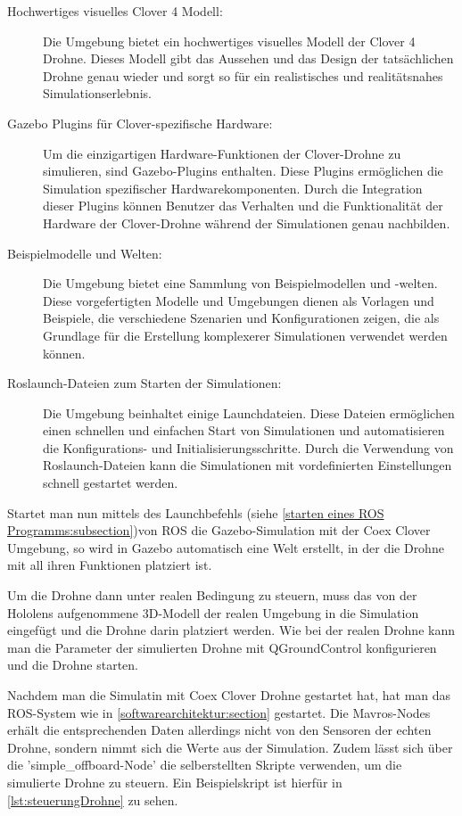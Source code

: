 \begin{description}
    \item[Hochwertiges visuelles Clover 4 Modell:] Die Umgebung bietet ein hochwertiges visuelles Modell der Clover 4 Drohne. Dieses Modell gibt das Aussehen und das Design der tatsächlichen Drohne genau wieder und sorgt so für ein realistisches und realitätsnahes Simulationserlebnis. 
    
    \item[Gazebo Plugins für Clover-spezifische Hardware:] Um die einzigartigen Hardware-Funktionen der Clover-Drohne zu simulieren, sind Gazebo-Plugins enthalten. Diese Plugins ermöglichen die Simulation spezifischer Hardwarekomponenten. Durch die Integration dieser Plugins können Benutzer das Verhalten und die Funktionalität der Hardware der Clover-Drohne während der Simulationen genau nachbilden.
    
    \item[Beispielmodelle und Welten:] Die Umgebung bietet eine Sammlung von Beispielmodellen und -welten. Diese vorgefertigten Modelle und Umgebungen dienen als Vorlagen und Beispiele, die verschiedene Szenarien und Konfigurationen zeigen, die als Grundlage für die Erstellung komplexerer Simulationen verwendet werden können.
    
    \item[Roslaunch-Dateien zum Starten der Simulationen:] Die Umgebung beinhaltet einige Launchdateien. Diese Dateien ermöglichen einen schnellen und einfachen Start von Simulationen und automatisieren die Konfigurations- und Initialisierungsschritte. Durch die Verwendung von Roslaunch-Dateien kann die Simulationen mit vordefinierten Einstellungen schnell gestartet werden.   
\end{description}

Startet man nun mittels des Launchbefehls (siehe \ref{starten eines ROS Programms:subsection})von \ac{ROS} die Gazebo-Simulation mit der Coex Clover Umgebung, so wird in Gazebo automatisch eine Welt erstellt, in der die Drohne mit all ihren Funktionen platziert ist.

Um die Drohne dann unter realen Bedingung zu steuern, muss das von der Hololens aufgenommene 3D-Modell der realen Umgebung in die Simulation eingefügt und die Drohne darin platziert werden. Wie bei der realen Drohne kann man die Parameter der simulierten Drohne mit QGroundControl konfigurieren und die Drohne starten.

Nachdem man die Simulatin mit Coex Clover Drohne gestartet hat, hat man das \ac{ROS}-System wie in \ref{softwarearchitektur:section} gestartet.
Die Mavros-Nodes erhält die entsprechenden Daten allerdings nicht von den Sensoren der echten Drohne, sondern nimmt sich die Werte aus der Simulation. Zudem lässt sich über die 'simple\_offboard-Node' die selberstellten Skripte verwenden, um die simulierte Drohne zu steuern. Ein Beispielskript ist hierfür in \ref{lst:steuerungDrohne} zu sehen.

